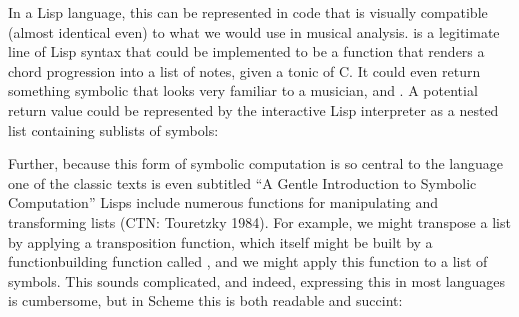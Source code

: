 \documentclass[letterpaper,10pt,english]{sphinxmanual}
\begin{document}
\sphinxAtStartPar
In a Lisp language, this can be represented in code that is visually compatible (almost identical even) to what we would use in musical analysis.
 is a legitimate line of Lisp syntax that could be implemented to be a function
that renders a chord progression into a list of notes, given a tonic of C.
It could even return something symbolic that looks very familiar to a musician, and .
A potential return value could be represented by the interactive Lisp interpreter as a nested list containing sublists of symbols:

\sphinxAtStartPar
Further, because this form of symbolic computation is so central to the language \sphinxhyphen{} one of the classic texts is even subtitled
“A Gentle Introduction to Symbolic Computation” \sphinxhyphen{} Lisps include numerous functions for manipulating and transforming lists (CTN: Touretzky 1984).
For example, we might transpose a list by applying a transposition function, which itself might be built by a function\sphinxhyphen{}building function
called , and we might apply this function to a list of symbols.
This sounds complicated, and indeed, expressing this in most languages is cumbersome, but in Scheme this is both readable and succint:

\begin{sphinxVerbatim}[commandchars=\\\{\}]

\end{sphinxVerbatim}
\end{document}
